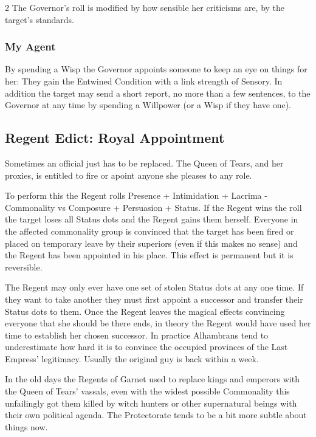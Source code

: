 \begin{multicols}{2}
The Governor's roll is modified by how sensible her criticisms are, by the target's standards.  

\subsubsection*{My Agent}

By spending a Wisp the Governor appoints someone to keep an eye on things for her: They gain the Entwined Condition with a link strength of Sensory. In addition the target may send a short report, no more than a few sentences, to the Governor at any time by spending a Willpower (or a Wisp if they have one).

\subsection*{Regent Edict: Royal Appointment}

Sometimes an official just has to be replaced. The Queen of Tears, and her proxies, is entitled to fire or apoint anyone she pleases to any role. 

To perform this the Regent rolls Presence + Intimidation + Lacrima - Commonality vs Composure + Persuasion + Status. If the Regent wins the roll the target loses all Status dots and the Regent gains them herself. Everyone in the affected commonality group is convinced that the target has been fired or placed on temporary leave by their superiors (even if this makes no sense) and the Regent has been appointed in his place. This effect is permanent but it is reversible. 

The Regent may only ever have one set of stolen Status dots at any one time. If they want to take another they must first appoint a successor and transfer their Status dots to them. Once the Regent leaves the magical effects convincing everyone that she should be there ends, in theory the Regent would have used her time to establish her chosen successor. In practice Alhambrans tend to underestimate how hard it is to convince the occupied provinces of the Last Empress' legitimacy. Usually the original guy is back within a week. 

In the old days the Regents of Garnet used to replace kings and emperors with the Queen of Tears' vassals, even with the widest possible Commonality this unfailingly got them killed by witch hunters or other supernatural beings with their own political agenda. The Protectorate tends to be a bit more subtle about things now. 


\end{multicols}
